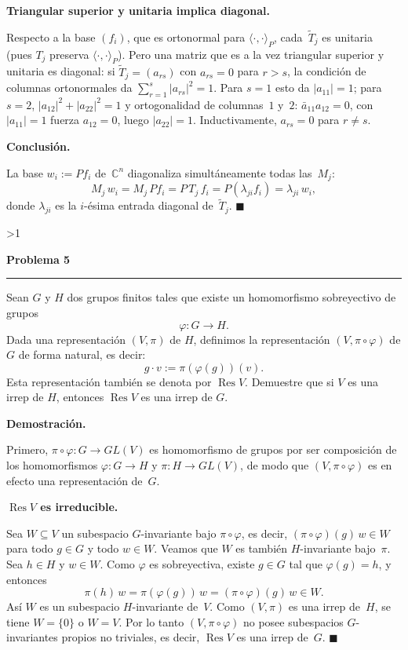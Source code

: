\documentclass[10pt,a4paper]{article}
\newcommand{\CC}{\mathbb{C}}
\newcommand{\inlinehead}[2][repblue]{%
  \par\smallskip
  {\color{#1}\bfseries #2.}\hspace{0.45em}%
}
\newcounter{probcnt}
\newcommand{\problem}[2]{%
  \stepcounter{probcnt}%
  \ifnum\value{probcnt}>1\newpage\fi
  \par\vspace{0.25em}
  {\large\bfseries\color{repblue} Problema #1}\par
  {\color{repline}\rule{\linewidth}{0.55pt}}\par
  \begin{tcolorbox}[
    breakable,
    colback=white,
    colframe=repline,
    borderline west={1.6pt}{0pt}{repteal},
    left=0.7em,
    right=0.7em,
    top=0.35em,
    bottom=0.3em,
    before skip=0.35em,
    after skip=0.45em
  ]
    #2
  \end{tcolorbox}
}
\begin{document}
\inlinehead[repteal]{Triangular superior y unitaria implica diagonal}
Respecto a la base $(f_i)$, que es ortonormal para $\langle\cdot,\cdot\rangle_P$,
cada~$\widetilde{T}_j$ es unitaria (pues $T_j$ preserva
$\langle\cdot,\cdot\rangle_P$). Pero una matriz que es a la vez triangular
superior y unitaria es diagonal: si $\widetilde{T}_j=(a_{rs})$ con
$a_{rs}=0$ para $r>s$, la condición de columnas ortonormales da
$\sum_{r=1}^{s}|a_{rs}|^2=1$. Para $s=1$ esto da $|a_{11}|=1$; para $s=2$,
$|a_{12}|^2+|a_{22}|^2=1$ y ortogonalidad de columnas~$1$ y~$2$:
$\bar{a}_{11}a_{12}=0$, con $|a_{11}|=1$ fuerza $a_{12}=0$, luego
$|a_{22}|=1$. Inductivamente, $a_{rs}=0$ para $r\neq s$.

\inlinehead[repteal]{Conclusión}
La base $w_i:=Pf_i$ de~$\CC^n$ diagonaliza simultáneamente todas las~$M_j$:
\[
  M_j\,w_i = M_j\,Pf_i = P\,T_j\,f_i = P(\lambda_{ji}f_i) = \lambda_{ji}\,w_i,
\]
donde $\lambda_{ji}$ es la $i$-ésima entrada diagonal de~$\widetilde{T}_j$.
\hfill$\blacksquare$

\problem{5}{%
Sean $G$ y $H$ dos grupos finitos tales que existe un homomorfismo
sobreyectivo de grupos
\[
  \varphi \colon G \to H.
\]
Dada una representación $(V,\pi)$ de $H$, definimos la representación
$(V,\pi\circ\varphi)$ de $G$ de forma natural, es decir:
\[
  g\cdot v := \pi(\varphi(g))(v).
\]
Esta representación también se denota por $\operatorname{Res} V$. Demuestre
que si $V$ es una irrep de $H$, entonces $\operatorname{Res} V$ es una irrep
de $G$.
}

\inlinehead{Demostración}
Primero, $\pi\circ\varphi\colon G\to GL(V)$ es homomorfismo de grupos por
ser composición de los homomorfismos $\varphi\colon G\to H$ y
$\pi\colon H\to GL(V)$, de modo que $(V,\pi\circ\varphi)$ es en efecto una
representación de~$G$.

\inlinehead[repteal]{$\operatorname{Res} V$ es irreducible}
Sea $W\subseteq V$ un subespacio $G$-invariante bajo $\pi\circ\varphi$, es
decir, $(\pi\circ\varphi)(g)\,w\in W$ para todo $g\in G$ y todo $w\in W$.
Veamos que $W$ es también $H$-invariante bajo~$\pi$. Sea $h\in H$ y
$w\in W$. Como $\varphi$ es sobreyectiva, existe $g\in G$ tal que
$\varphi(g)=h$, y entonces
\[
  \pi(h)\,w = \pi(\varphi(g))\,w = (\pi\circ\varphi)(g)\,w \in W.
\]
Así $W$ es un subespacio $H$-invariante de~$V$. Como $(V,\pi)$ es una irrep
de~$H$, se tiene $W=\{0\}$ o $W=V$. Por lo tanto $(V,\pi\circ\varphi)$ no
posee subespacios $G$-invariantes propios no triviales, es decir,
$\operatorname{Res} V$ es una irrep de~$G$.
\hfill$\blacksquare$
\end{document}

